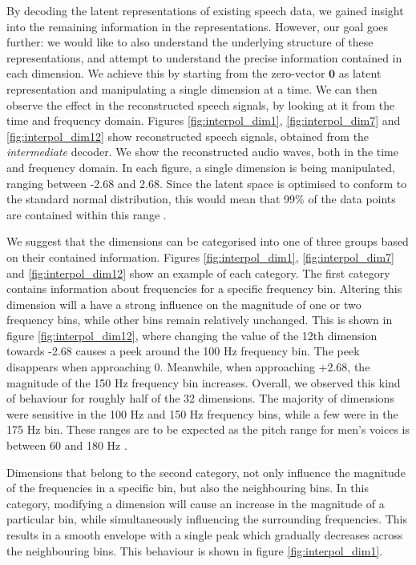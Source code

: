 		
		
		By decoding the latent representations of existing speech data, we gained insight into the remaining information in the representations. However, our goal goes further: we would like to also understand the underlying structure of these representations, and attempt to understand the precise information contained in each dimension. We achieve this by starting from the zero-vector $\textbf{0}$ as latent representation and manipulating a single dimension at a time. We can then observe the effect in the reconstructed speech signals, by looking at it from the time and frequency domain. Figures \ref{fig:interpol_dim1}, \ref{fig:interpol_dim7} and \ref{fig:interpol_dim12} show reconstructed speech signals, obtained from the \textit{intermediate} decoder. We show the reconstructed audio waves, both in the time and frequency domain. In each figure, a single dimension is being manipulated, ranging between -2.68 and 2.68. Since the latent space is optimised to conform to the standard normal distribution, this would mean that 99\% of the data points are contained within this range \citep{bhandariStandardNormalDistribution2020}.
		
		We suggest that the dimensions can be categorised into one of three groups based on their contained information. Figures \ref{fig:interpol_dim1}, \ref{fig:interpol_dim7} and \ref{fig:interpol_dim12} show an example of each category. The first category contains information about frequencies for a specific frequency bin. Altering this dimension will a have a strong influence on the magnitude of one or two frequency bins, while other bins remain relatively unchanged. This is shown in figure \ref{fig:interpol_dim12}, where changing the value of the 12th dimension towards -2.68 causes a peek around the 100 Hz frequency bin. The peek disappears when approaching 0. Meanwhile, when approaching +2.68, the magnitude of the 150 Hz frequency bin increases. Overall, we observed this kind of behaviour for roughly half of the 32 dimensions. The majority of dimensions were sensitive in the 100 Hz and 150 Hz frequency bins, while a few were in the 175 Hz bin. These ranges are to be expected as the pitch range for men's voices is between 60 and 180 Hz \citep{rePreferencesVeryLow2012}.
		
		Dimensions that belong to the second category, not only influence the magnitude of the frequencies in a specific bin, but also the neighbouring bins. In this category, modifying a dimension will cause an increase in the magnitude of a particular bin, while simultaneously influencing the surrounding frequencies. This results in a smooth envelope with a single peak which gradually decreases across the neighbouring bins. This behaviour is shown in figure \ref{fig:interpol_dim1}.
		
